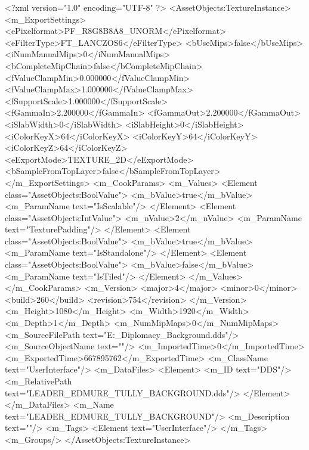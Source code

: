 <?xml version="1.0" encoding="UTF-8" ?>
<AssetObjects:TextureInstance>
	<m_ExportSettings>
		<ePixelformat>PF_R8G8B8A8_UNORM</ePixelformat>
		<eFilterType>FT_LANCZOS6</eFilterType>
		<bUseMips>false</bUseMips>
		<iNumManualMips>0</iNumManualMips>
		<bCompleteMipChain>false</bCompleteMipChain>
		<fValueClampMin>0.000000</fValueClampMin>
		<fValueClampMax>1.000000</fValueClampMax>
		<fSupportScale>1.000000</fSupportScale>
		<fGammaIn>2.200000</fGammaIn>
		<fGammaOut>2.200000</fGammaOut>
		<iSlabWidth>0</iSlabWidth>
		<iSlabHeight>0</iSlabHeight>
		<iColorKeyX>64</iColorKeyX>
		<iColorKeyY>64</iColorKeyY>
		<iColorKeyZ>64</iColorKeyZ>
		<eExportMode>TEXTURE_2D</eExportMode>
		<bSampleFromTopLayer>false</bSampleFromTopLayer>
	</m_ExportSettings>
	<m_CookParams>
		<m_Values>
			<Element class="AssetObjects:BoolValue">
				<m_bValue>true</m_bValue>
				<m_ParamName text="IsScalable"/>
			</Element>
			<Element class="AssetObjects:IntValue">
				<m_nValue>2</m_nValue>
				<m_ParamName text="TexturePadding"/>
			</Element>
			<Element class="AssetObjects:BoolValue">
				<m_bValue>true</m_bValue>
				<m_ParamName text="IsStandalone"/>
			</Element>
			<Element class="AssetObjects:BoolValue">
				<m_bValue>false</m_bValue>
				<m_ParamName text="IsTiled"/>
			</Element>
		</m_Values>
	</m_CookParams>
	<m_Version>
		<major>4</major>
		<minor>0</minor>
		<build>260</build>
		<revision>754</revision>
	</m_Version>
	<m_Height>1080</m_Height>
	<m_Width>1920</m_Width>
	<m_Depth>1</m_Depth>
	<m_NumMipMaps>0</m_NumMipMaps>
	<m_SourceFilePath text="E:\Jordi\Escritorio\ModdingIcons\SOIAF\Leaders\EdmureTully_Diplomacy_Background.dds"/>
	<m_SourceObjectName text=""/>
	<m_ImportedTime>0</m_ImportedTime>
	<m_ExportedTime>667895762</m_ExportedTime>
	<m_ClassName text="UserInterface"/>
	<m_DataFiles>
		<Element>
			<m_ID text="DDS"/>
			<m_RelativePath text="LEADER_EDMURE_TULLY_BACKGROUND.dds"/>
		</Element>
	</m_DataFiles>
	<m_Name text="LEADER_EDMURE_TULLY_BACKGROUND"/>
	<m_Description text=""/>
	<m_Tags>
		<Element text="UserInterface"/>
	</m_Tags>
	<m_Groups/>
</AssetObjects:TextureInstance>

 